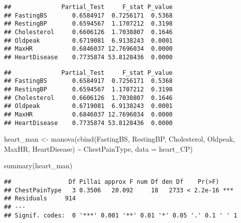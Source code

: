 \documentclass[
]{article}
\newenvironment{Shaded}{\begin{snugshade}}{\end{snugshade}}
\newcommand{\AttributeTok}[1]{\textcolor[rgb]{0.77,0.63,0.00}{#1}}
\newcommand{\FunctionTok}[1]{\textcolor[rgb]{0.00,0.00,0.00}{#1}}
\newcommand{\NormalTok}[1]{#1}
\newcommand{\OtherTok}[1]{\textcolor[rgb]{0.56,0.35,0.01}{#1}}
\newcommand{\SpecialCharTok}[1]{\textcolor[rgb]{0.00,0.00,0.00}{#1}}
\begin{document}
\begin{verbatim}
##              Partial_Test     F_stat P_value
## FastingBS       0.6584917  0.7256171  0.5368
## RestingBP       0.6594567  1.1707212  0.3198
## Cholesterol     0.6606126  1.7038807  0.1646
## Oldpeak         0.6719081  6.9138243  0.0001
## MaxHR           0.6846037 12.7696034  0.0000
## HeartDisease    0.7735874 53.8128436  0.0000
\end{verbatim}

\begin{Shaded}
\end{Shaded}

\begin{verbatim}
##              Partial_Test     F_stat P_value
## FastingBS       0.6584917  0.7256171  0.5368
## RestingBP       0.6594567  1.1707212  0.3198
## Cholesterol     0.6606126  1.7038807  0.1646
## Oldpeak         0.6719081  6.9138243  0.0001
## MaxHR           0.6846037 12.7696034  0.0000
## HeartDisease    0.7735874 53.8128436  0.0000
\end{verbatim}

\begin{Shaded}
\begin{Highlighting}[]
\NormalTok{heart\_man }\OtherTok{\textless{}{-}} \FunctionTok{manova}\NormalTok{(}\FunctionTok{cbind}\NormalTok{(FastingBS, RestingBP, Cholesterol, Oldpeak, MaxHR, HeartDisease) }\SpecialCharTok{\textasciitilde{}}\NormalTok{ ChestPainType,}
    \AttributeTok{data =}\NormalTok{ heart\_CP)}

\FunctionTok{summary}\NormalTok{(heart\_man)}
\end{Highlighting}
\end{Shaded}

\begin{verbatim}
##                Df Pillai approx F num Df den Df    Pr(>F)    
## ChestPainType   3 0.3506   20.092     18   2733 < 2.2e-16 ***
## Residuals     914                                            
## ---
## Signif. codes:  0 '***' 0.001 '**' 0.01 '*' 0.05 '.' 0.1 ' ' 1
\end{verbatim}
\end{document}
